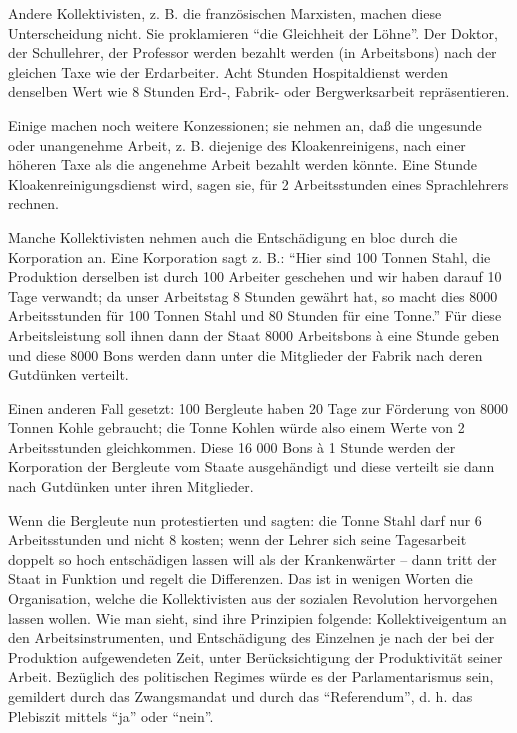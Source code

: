 \documentclass{scrbook}
\begin{document}
Andere Kollektivisten, z. B. die französischen Marxisten, machen diese Unterscheidung nicht. Sie proklamieren ``die Gleichheit der Löhne''. Der Doktor, der Schullehrer, der Professor werden bezahlt werden (in Arbeitsbons) nach der gleichen Taxe wie der Erdarbeiter. Acht Stunden Hospitaldienst werden denselben Wert wie 8 Stunden Erd-, Fabrik- oder Bergwerksarbeit repräsentieren.

Einige machen noch weitere Konzessionen; sie nehmen an, daß die ungesunde oder unangenehme Arbeit, z. B. diejenige des Kloakenreinigens, nach einer höheren Taxe als die angenehme Arbeit bezahlt werden könnte. Eine Stunde Kloakenreinigungsdienst wird, sagen sie, für 2 Arbeitsstunden eines Sprachlehrers rechnen.

Manche Kollektivisten nehmen auch die Entschädigung en bloc durch die Korporation an. Eine Korporation sagt z. B.: ``Hier sind 100 Tonnen Stahl, die Produktion derselben ist durch 100 Arbeiter geschehen und wir haben darauf 10 Tage verwandt; da unser Arbeitstag 8 Stunden gewährt hat, so macht dies 8000 Arbeitsstunden für 100 Tonnen Stahl und 80 Stunden für eine Tonne.'' Für diese Arbeitsleistung soll ihnen dann der Staat 8000 Arbeitsbons à eine Stunde geben und diese 8000 Bons werden dann unter die Mitglieder der Fabrik nach deren Gutdünken verteilt.

Einen anderen Fall gesetzt: 100 Bergleute haben 20 Tage zur Förderung von 8000 Tonnen Kohle gebraucht; die Tonne Kohlen würde also einem Werte von 2 Arbeitsstunden gleichkommen. Diese 16 000 Bons à 1 Stunde werden der Korporation der Bergleute vom Staate ausgehändigt und diese verteilt sie dann nach Gutdünken unter ihren Mitglieder.

Wenn die Bergleute nun protestierten und sagten: die Tonne Stahl darf nur 6 Arbeitsstunden und nicht 8 kosten; wenn der Lehrer sich seine Tagesarbeit doppelt so hoch entschädigen lassen will als der Krankenwärter – dann tritt der Staat in Funktion und regelt die Differenzen. Das ist in wenigen Worten die Organisation, welche die Kollektivisten aus der sozialen Revolution hervorgehen lassen wollen. Wie man sieht, sind ihre Prinzipien folgende: Kollektiveigentum an den Arbeitsinstrumenten, und Entschädigung des Einzelnen je nach der bei der Produktion aufgewendeten Zeit, unter Berücksichtigung der Produktivität seiner Arbeit. Bezüglich des politischen Regimes würde es der Parlamentarismus sein, gemildert durch das Zwangsmandat und durch das ``Referendum'', d. h. das Plebiszit mittels ``ja'' oder ``nein''.
\end{document}
